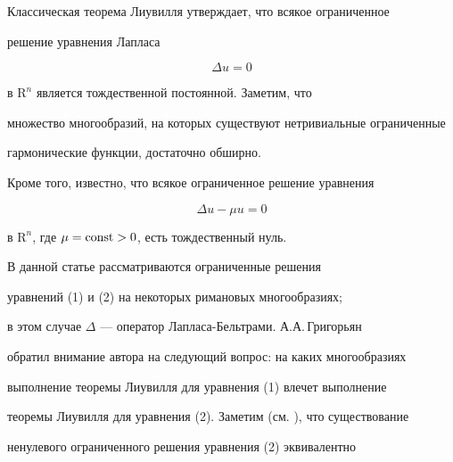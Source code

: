  


\maketitle 


 







Классическая теорема Лиувилля утверждает, что всякое ограниченное


решение уравнения Лапласа


%


\begin{equation}


\Delta u = 0


\end{equation}


%


в $\mathrm R^n$ является тождественной постоянной. Заметим, что


множество многообразий, на которых существуют нетривиальные ограниченные


гармонические функции, достаточно обширно.


Кроме того, известно, что всякое ограниченное решение уравнения


%


\begin{equation}


\Delta u - \mu u = 0


\end{equation}


%


в $\mathrm R^n$, где $\mu = \operatorname{const} > 0$, есть тождественный нуль.





В данной статье рассматриваются ограниченные решения


уравнений (1) и (2) на некоторых римановых многообразиях;


в этом случае $\Delta$ --- оператор Лапласа-Бельтрами. А.А.\,Григорьян


обратил внимание автора на следующий вопрос: на каких многообразиях


выполнение теоремы Лиувилля для уравнения (1) влечет выполнение


теоремы Лиувилля для уравнения (2). Заметим (см. \cite{Dav}), что существование


ненулевого ограниченного решения уравнения (2) эквивалентно


